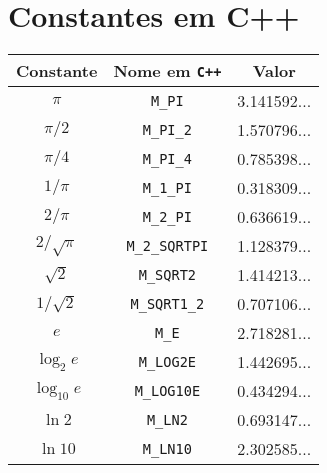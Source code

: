 \section{Constantes em C++}

\begin{center}
\begin{tabular}{|c|c|c|}
  \hline
  Constante & Nome em \texttt{C++} & Valor \\
  \hline
  $\pi$ & \texttt{M\_PI} & 3.141592... \\
  \hline
  $\pi / 2$ & \texttt{M\_PI\_2} & 1.570796... \\
  \hline
  $\pi / 4$ & \texttt{M\_PI\_4} & 0.785398... \\
  \hline
  $1 / \pi$ & \texttt{M\_1\_PI} & 0.318309... \\
  \hline
  $2 / \pi$ & \texttt{M\_2\_PI} & 0.636619... \\
  \hline
  $2 / \sqrt{\pi}$ & \texttt{M\_2\_SQRTPI} & 1.128379... \\
  \hline
  $\sqrt{2}$ & \texttt{M\_SQRT2} & 1.414213... \\
  \hline
  $1 / \sqrt{2}$ & \texttt{M\_SQRT1\_2} & 0.707106... \\
  \hline
  $e$ & \texttt{M\_E} & 2.718281... \\
  \hline
  $\log_2{e}$ & \texttt{M\_LOG2E} & 1.442695... \\
  \hline
  $\log_{10}{e}$ & \texttt{M\_LOG10E} & 0.434294... \\
  \hline
  $\ln{2}$ & \texttt{M\_LN2} & 0.693147... \\
  \hline
  $\ln{10}$ & \texttt{M\_LN10} & 2.302585... \\
  \hline
\end{tabular}
\end{center}
